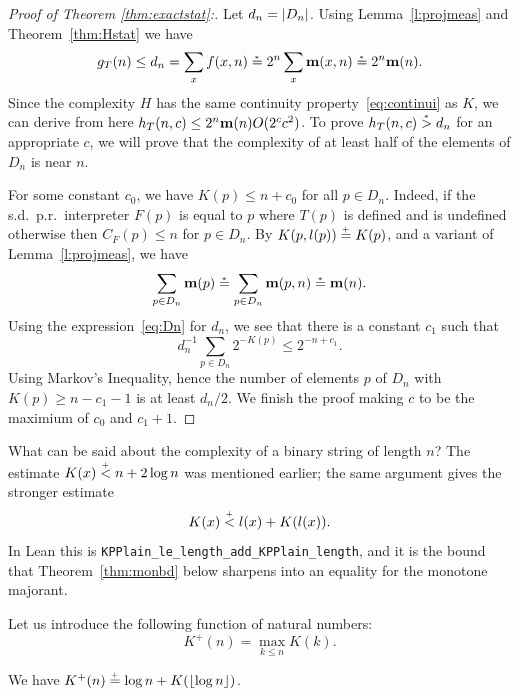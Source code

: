 \begin{proof}[Proof of Theorem \protect\ref{thm:exactstat}:]
  \leanok
 Let $d_{n} = |D_{n}|$. Using Lemma~\ref{l:projmeas} and 
Theorem~\ref{thm:Hstat} we have 
 \[
	g_{T}(n) \le d_{n} = \sum_{x} f(x,n) \stackrel{{}_*}{=} 2^{n} \sum_{x} \mathbf{m}(x,n) 
			\stackrel{{}_*}{=} 2^{n} \mathbf{m}(n).
 \]
  Since the complexity $H$ has the same continuity 
property~\eqref{eq:continui} as $K$, we can derive from here
 $h_{T}(n,c) \le 2^{n}\mathbf{m}(n)O(2^c c^2)$.
  To prove $h_{T}(n,c) \stackrel{{}_*}{>} d_{n}$ for an appropriate $c$, we will prove that
the complexity of at least half of the elements of $D_{n}$ is near $n$.

  For some constant $c_{0}$, we have $K(p) \le n + c_{0}$ for all $p \in
D_{n}$. 
  Indeed, if the s.d.~p.r.~interpreter $F(p)$ is equal to $p$
where $T(p)$ is defined and is undefined otherwise then $C_{F}(p) \le
n$ for $p \in D_{n}$.
  By $K(p,l(p))\stackrel{{}_+}{=} K(p)$, and a variant of Lemma~\ref{l:projmeas}, we have
 \[
 \sum_{p \in D_{n}}\mathbf{m}(p) \stackrel{{}_*}{=} \sum_{p \in D_{n}} \mathbf{m}(p,n) \stackrel{{}_*}{=} \mathbf{m}(n).
 \]
  Using the expression~\eqref{eq:Dn} for $d_{n}$, we see that there is a
constant $c_{1}$ such that 
 \[
  d_{n}^{-1} \sum_{p \in D_{n}} 2^{-K(p)} \le 2^{-n+c_{1}}.
 \]
  Using Markov's Inequality, hence the number of elements $p$ of $D_{n}$
with $K(p) \ge n-c_{1}-1$ is at least $d_{n}/2$.
  We finish the proof making $c$ to be the maximium of $c_{0}$ and $c_{1}+1$.
 \end{proof}

What can be said about the complexity of a binary string of length \( n \)? The
estimate \( K(x) \stackrel{{}_+}{<} n + 2\log n \) was mentioned earlier; the same argument gives the
stronger estimate
\begin{equation} K(x) \stackrel{{}_+}{<} l(x) + K(l(x)). \label{eq:monbd}
\end{equation}
In Lean this is \texttt{KPPlain\_le\_length\_add\_KPPlain\_length}, and it is the bound that
Theorem~\ref{thm:monbd} below sharpens into an equality for the monotone majorant.


 \begin{definition}
  \label{def:Kplus}
  \leanok
Let us introduce the following function of natural numbers:
 \[	
  K^{+}(n) = \max_{k \le n} K(k).
 \]
 \end{definition}

\begin{theorem}
  \leanok
   \label{thm:monbd} 
We have $K^+(n) \stackrel{{}_+}{=} \log n + K({\lfloor  \log n \rfloor})$.
  \end{theorem}

